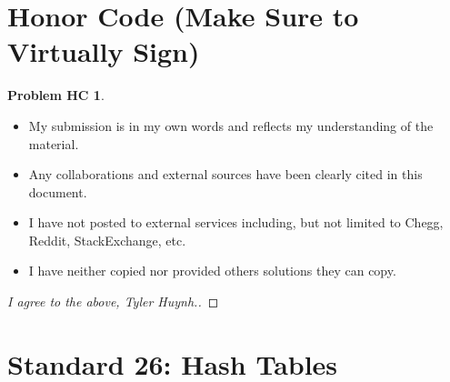 \documentclass[11pt]{article}
\theoremstyle{definition}
\theoremstyle{definition}
\newtheorem*{requiredHC}{Problem HC}
\theoremstyle{definition}
\newcommand{\standard}{26}
\begin{document}
\newpage
\section*{Honor Code (Make Sure to Virtually Sign)} \label{HonorCode}
\hypertarget{HonorCode}{}

\begin{requiredHC}
\begin{itemize}
\item My submission is in my own words and reflects my understanding of the material.
\item Any collaborations and external sources have been clearly cited in this document.
\item I have not posted to external services including, but not limited to Chegg, Reddit, StackExchange, etc.
\item I have neither copied nor provided others solutions they can copy.
\end{itemize}

\end{requiredHC}

\begin{proof}[I agree to the above, Tyler Huynh.]
\end{proof}


\newpage
\setcounter{section}{\standard-1}
\section{Standard \standard: Hash Tables}
\end{document}
